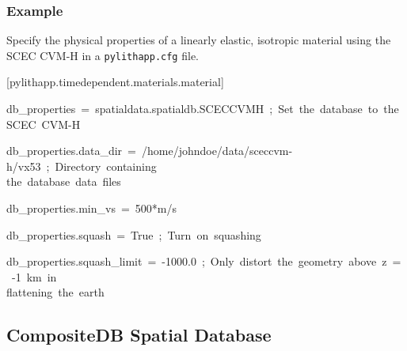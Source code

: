 \subsubsection{Example}

Specify the physical properties of a linearly elastic, isotropic material
using the SCEC CVM-H in a \texttt{pylithapp.cfg} file.
\begin{lyxcode}
{\small{}{[}pylithapp.timedependent.materials.material{]}}{\small \par}

{\small{}db\_properties~=~spatialdata.spatialdb.SCECCVMH~;~Set~the~database~to~the~SCEC~CVM-H}{\small \par}

{\small{}db\_properties.data\_dir~=~/home/johndoe/data/sceccvm-h/vx53~;~Directory~containing}~\\
{\small{}the~database~data~files}{\small \par}

{\small{}db\_properties.min\_vs~=~500{*}m/s}{\small \par}

{\small{}db\_properties.squash~=~True~;~Turn~on~squashing}{\small \par}

{\small{}db\_properties.squash\_limit~=~-1000.0~;~Only~distort~the~geometry~above~z~=~-1~km~in~}~\\
{\small{}flattening~the~earth}{\small \par}
\end{lyxcode}

\subsection{CompositeDB Spatial Database}

